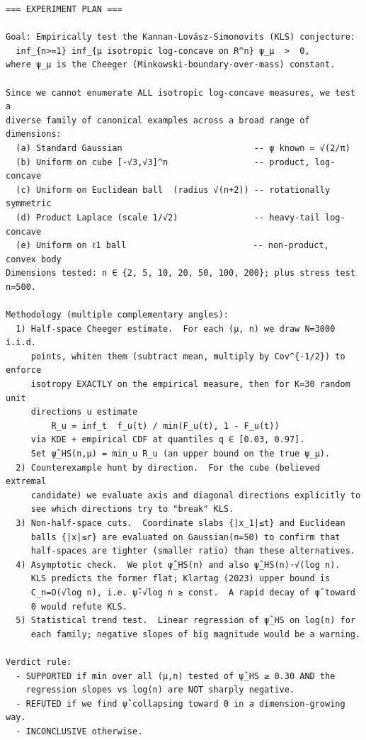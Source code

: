 \documentclass[11pt]{article}
\begin{document}
\begin{lstlisting}
=== EXPERIMENT PLAN ===

Goal: Empirically test the Kannan-Lovász-Simonovits (KLS) conjecture:
  inf_{n>=1} inf_{μ isotropic log-concave on R^n} ψ_μ  >  0,
where ψ_μ is the Cheeger (Minkowski-boundary-over-mass) constant.

Since we cannot enumerate ALL isotropic log-concave measures, we test a
diverse family of canonical examples across a broad range of dimensions:
  (a) Standard Gaussian                          -- ψ known = √(2/π)
  (b) Uniform on cube [-√3,√3]^n                 -- product, log-concave
  (c) Uniform on Euclidean ball  (radius √(n+2)) -- rotationally symmetric
  (d) Product Laplace (scale 1/√2)               -- heavy-tail log-concave
  (e) Uniform on ℓ1 ball                         -- non-product, convex body
Dimensions tested: n ∈ {2, 5, 10, 20, 50, 100, 200}; plus stress test n=500.

Methodology (multiple complementary angles):
  1) Half-space Cheeger estimate.  For each (μ, n) we draw N=3000 i.i.d.
     points, whiten them (subtract mean, multiply by Cov^{-1/2}) to enforce
     isotropy EXACTLY on the empirical measure, then for K=30 random unit
     directions u estimate
         R_u = inf_t  f_u(t) / min(F_u(t), 1 - F_u(t))
     via KDE + empirical CDF at quantiles q ∈ [0.03, 0.97].
     Set ψ̂_HS(n,μ) = min_u R_u (an upper bound on the true ψ_μ).
  2) Counterexample hunt by direction.  For the cube (believed extremal
     candidate) we evaluate axis and diagonal directions explicitly to
     see which directions try to "break" KLS.
  3) Non-half-space cuts.  Coordinate slabs {|x_1|≤t} and Euclidean
     balls {|x|≤r} are evaluated on Gaussian(n=50) to confirm that
     half-spaces are tighter (smaller ratio) than these alternatives.
  4) Asymptotic check.  We plot ψ̂_HS(n) and also ψ̂_HS(n)·√(log n).
     KLS predicts the former flat; Klartag (2023) upper bound is
     C_n=O(√log n), i.e. ψ̂·√log n ≥ const.  A rapid decay of ψ̂ toward
     0 would refute KLS.
  5) Statistical trend test.  Linear regression of ψ̂_HS on log(n) for
     each family; negative slopes of big magnitude would be a warning.

Verdict rule:
  - SUPPORTED if min over all (μ,n) tested of ψ̂_HS ≥ 0.30 AND the
    regression slopes vs log(n) are NOT sharply negative.
  - REFUTED if we find ψ̂ collapsing toward 0 in a dimension-growing way.
  - INCONCLUSIVE otherwise.


\end{lstlisting}
\end{document}
